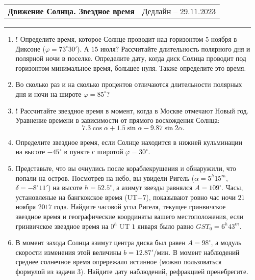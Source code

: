 \documentclass[12pt]{article}
\begin{document}
\begin{tabularx}{\textwidth}{Xr}
{\Large \textbf{Движение Солнца. Звездное время}} & Дедлайн -- $29.11.2023$ \\
\end{tabularx}
\noindent\rule{\textwidth}{0.4pt}
\begin{enumerate}
    \item \textbf{!} Определите время, которое Солнце проводит над горизонтом $5$ ноября в Диксоне ($\varphi = 73^{\circ}30'$). А $15$ июля? Рассчитайте длительность полярного дня и полярной ночи в поселке. Определите дату, когда диск Солнца проводит под горизонтом минимальное время, большее нуля. Также определите это время.
    \item Во сколько раз и на сколько процентов отличаются длительности полярных дня и ночи на широте $\varphi = 85^{\circ}$? 
    \item \textbf{!} Рассчитайте звездное время в момент, когда в Москве отмечают Новый год. Уравнение времени в зависимости от прямого восхождения Солнца:
    $$
    7.3\cos{\alpha} + 1.5\sin{\alpha} - 9.87\sin{2\alpha}.
    $$
    \item Определите звездное время, если Солнце находится в нижней кульминации на высоте $-45^{\circ}$ в пункте с широтой $\varphi = 30^{\circ}$.
    \item Представьте, что вы очнулись после кораблекрушения и обнаружили, что попали на остров. Посмотрев на небо, вы увидели Ригель ($\alpha = 5^h15^m$, $\delta = -8^{\circ}11'$) на высоте $h = 52.5^{\circ}$, а азимут звезды равнялся $A = 109^{\circ}$. Часы, установленые на бангкокское время (UT+7), показывают ровно час ночи $21$ ноября $2017$ года. Найдите часовой угол Ригеля, текущее гринвичское звездное время и географические координаты вашего местоположения, если гринвичское звездное время на $0^h$ UT $1$ января было равно $GST_0 = 6^h43^m$.
    \item В момент захода Солнца азимут центра диска был равен $A = 98^{\circ}$, а модуль скорости изменения этой величины $b = 12.87'$/мин. В момент наблюдений среднее солнечное время опрережало истинное (можно пользоваться формулой из задачи $3$). Найдите дату наблюдений, рефракцией пренебрегите.
\end{enumerate}
\end{document}
